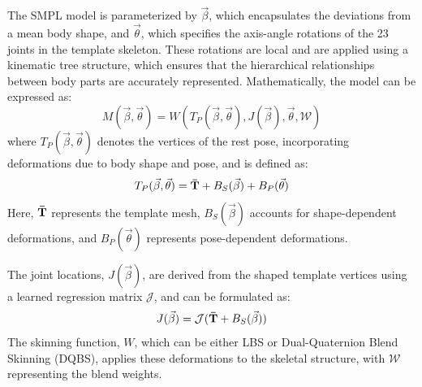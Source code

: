 The SMPL model is parameterized by $\vec{\beta}$, which encapsulates the deviations from a mean body shape, and $\vec{\theta}$, which specifies the axis-angle rotations of the 23 joints in the template skeleton. These rotations are local and are applied using a kinematic tree structure, which ensures that the hierarchical relationships between body parts are accurately represented. Mathematically, the model can be expressed as:
\begin{equation}
    M(\vec{\beta}, \vec{\theta}) = W(T_P(\vec{\beta}, \vec{\theta}), J(\vec{\beta}), \vec{\theta}, \mathcal{W})
\end{equation}
where $T_P(\vec{\beta}, \vec{\theta})$ denotes the vertices of the rest pose, incorporating deformations due to body shape and pose, and is defined as:
\begin{equation}
    T_P(\vec{\beta}, \vec{\theta}) = \boldsymbol{\mathbf{\bar{T}}} + B_S(\vec{\beta}) + B_P(\vec{\theta})
\end{equation}
Here, $\boldsymbol{\mathbf{\bar{T}}}$ represents the template mesh, $B_S(\vec{\beta})$ accounts for shape-dependent deformations, and $B_P(\vec{\theta})$ represents pose-dependent deformations.

The joint locations, $J(\vec{\beta})$, are derived from the shaped template vertices using a learned regression matrix $\mathcal{J}$, and can be formulated as:
\begin{equation} \label{eq:smpl-joints}
    J(\vec{\beta}) = \mathcal{J}(\boldsymbol{\mathbf{\bar{T}}} + B_S(\vec{\beta}))
\end{equation}
The skinning function, $W$, which can be either LBS or Dual-Quaternion Blend Skinning (DQBS), applies these deformations to the skeletal structure, with $\mathcal{W}$ representing the blend weights.

